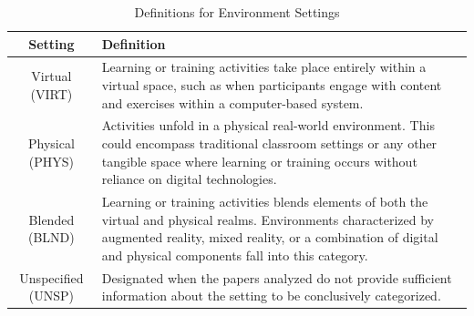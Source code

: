 \documentclass[manuscript,screen,review]{acmart}
\begin{document}

\begin{table}[ht]
  \centering
  \caption{Definitions for Environment Settings}
  \label{tab:environment-settings}
  \begin{tabular}{|c|p{}|}
    \hline
    \textbf{Setting} & \textbf{Definition} \\
    \hline
    Virtual (VIRT) & Learning or training activities take place entirely within a virtual space, such as when participants engage with content and exercises within a computer-based system. \\
    \hline
    Physical (PHYS) & Activities unfold in a physical real-world environment. This could encompass traditional classroom settings or any other tangible space where learning or training occurs without reliance on digital technologies. \\
    \hline
    Blended (BLND) & Learning or training activities blends elements of both the virtual and physical realms. Environments characterized by augmented reality, mixed reality, or a combination of digital and physical components fall into this category. \\
    \hline
    Unspecified (UNSP) & Designated when the papers analyzed do not provide sufficient information about the setting to be conclusively categorized. \\
    \hline
  \end{tabular}
\end{table}
\end{document}

